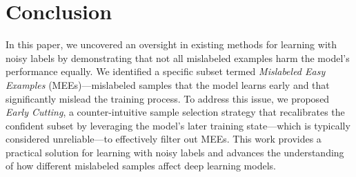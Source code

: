 \section{Conclusion}
In this paper, we uncovered an oversight in existing methods for learning with noisy labels by demonstrating that not all mislabeled examples harm the model's performance equally. We identified a specific subset termed \emph{Mislabeled Easy Examples} (MEEs)—mislabeled samples that the model learns early and that significantly mislead the training process. To address this issue, we proposed \emph{Early Cutting}, a counter-intuitive sample selection strategy that recalibrates the confident subset by leveraging the model's later training state—which is typically considered unreliable—to effectively filter out MEEs. This work provides a practical solution for learning with noisy labels and advances the understanding of how different mislabeled samples affect deep learning models.